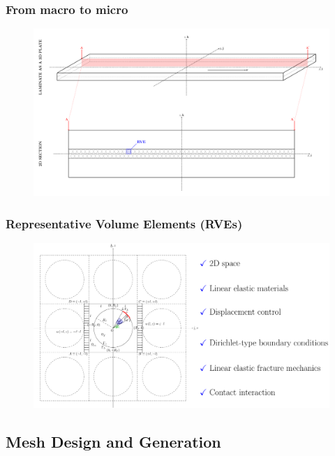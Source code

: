 \documentclass[first,firstsupp,lastsupp,handout,last,hyperref,table]{ETHclass}
\begin{document}
\begin{frame}
\frametitle{From macro to micro}
\vspace{-1cm}
\centering
\begin{figure}
\centering
\includegraphics[height=0.85\textheight]{laminate-section.pdf}
\label{fig:spread-tow-schematic}
\end{figure}
\end{frame}

\begin{frame}
\frametitle{Representative Volume Elements (RVEs)}
\vspace{-0.75cm}
\centering
\begin{figure}
\centering
\includegraphics[height=0.8\textheight]{periodicRVE_cc.pdf}
\label{fig:periodicRVE}
\end{figure}
\end{frame}

\subsection[Mesh Design]{Mesh Design and Generation}
\end{document}
